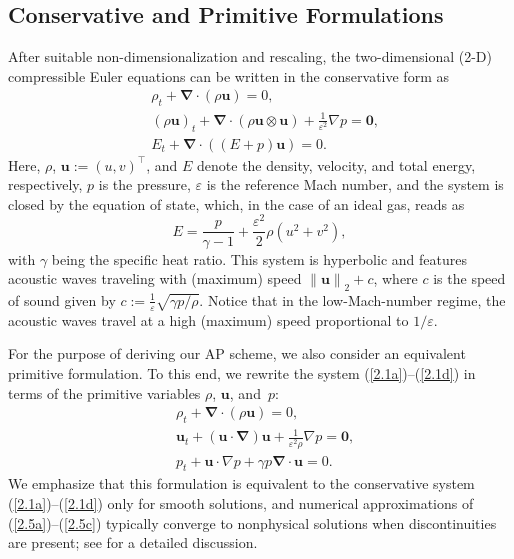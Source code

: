 \documentclass[A4paper,12pt,twoside]{article}
\numberwithin{equation}{section}
\numberwithin{figure}{section}
\numberwithin{table}{section}
\def\bnabla{\bm{\nabla}}
\newcommand{\ve}{\varepsilon}
\newcommand\eref[1]{(\ref{#1})}
\newcommand\norm[1]{\left\lVert#1\right\rVert}
\newcommand{\lore}[1]{{\leavevmode\color{red} #1}}
\begin{document}
\subsection{Conservative and Primitive Formulations}\label{sec21}
After suitable non-dimensionalization and rescaling, the two-dimensional (2-D) compressible Euler equations can be written in the
conservative form as
\begin{align}
&\rho_t+\bnabla\!\cdot\!(\rho\bm u)=0,\label{2.1a}\\
&(\rho\bm u)_t+\bnabla\!\cdot\!(\rho\bm u\otimes\bm u)+\frac{1}{\ve^2}\nabla p=\bm0,\label{2.1b}\\
&E_t+\bnabla\!\cdot\!((E+p)\bm u)=0.\label{2.1c}
\end{align}
Here, $\rho$, $\bm u:=(u,v)^\top$, and $E$ denote the density, velocity, and total energy, respectively, $p$ is the pressure, $\ve$ is the 
reference Mach number, and the system is closed by the equation of state, which, in the case of an ideal gas, reads as
\begin{equation}
E=\frac{p}{\gamma-1}+\frac{\ve^2}{2}\rho(u^2+v^2),
\label{2.1d}
\end{equation}
with $\gamma$ being the specific heat ratio. This system is hyperbolic and features acoustic waves traveling with \lore{(maximum)} speed $\norm{\bm u}_2+c$, where
$c$ is \lore{the} speed of sound given by $c:=\frac{1}{\ve}\sqrt{\gamma p/\rho}$. Notice that in the low-Mach-number regime, the acoustic waves
travel at a high \lore{(maximum)} speed proportional to $1/\ve$.

For the purpose of deriving \lore{our} AP scheme, %
we also consider an equivalent primitive formulation. %
To this end, we rewrite the system \eref{2.1a}--\eref{2.1d} in terms of the primitive variables
$\rho$, $\bm u$, and~$p$:
\begin{align}
&\rho_t+\bnabla\!\cdot\!(\rho\bm u)=0,\label{2.5a}\\
&\bm u_t+(\bm u\!\cdot\!\bnabla)\bm u+\frac{1}{\ve^2\rho}\nabla p=\bm0,\label{2.5b}\\
&p_t+\bm u\!\cdot\!\nabla p+\gamma p\bnabla\!\cdot\!\bm u=0.\label{2.5c}
\end{align}
We emphasize that this formulation is equivalent to the conservative system \eref{2.1a}--\eref{2.1d} only for smooth solutions, and numerical
approximations of \eref{2.5a}--\eref{2.5c} typically converge to nonphysical solutions \lore{when discontinuities are present}; see 
\cite{abgrall2010comment,HouLeF} for a detailed discussion.
\end{document}
